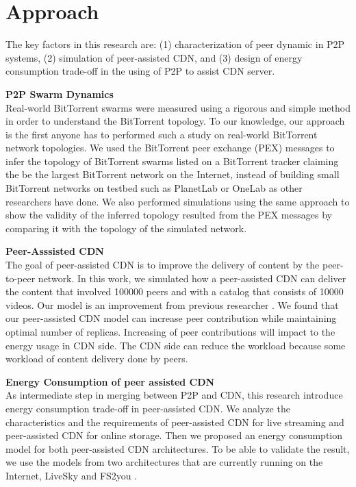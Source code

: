 \section{Approach}
The key factors in this research are: (1) characterization of peer dynamic in P2P systems, (2) simulation of peer-assisted CDN, and (3) design of energy consumption trade-off in the using of P2P to assist CDN server.

\textbf{P2P Swarm Dynamics}\\
Real-world BitTorrent swarms were measured using a rigorous and simple method in order to understand the BitTorrent topology. 
To our knowledge, our approach is the first anyone has to performed such a study on real-world BitTorrent network topologies. 
We used the BitTorrent peer exchange (PEX) messages to infer the topology of BitTorrent swarms listed on a BitTorrent tracker claiming the be the largest BitTorrent network on the Internet, instead of building small BitTorrent networks on testbed such as PlanetLab or OneLab as other researchers have done\cite{dale2008evolution}.
We also performed simulations using the same approach to show the validity of the inferred topology resulted from the PEX messages by comparing it with the topology of the simulated network.

\textbf{Peer-Asssisted CDN}\\
The goal of peer-assisted CDN is to improve the delivery of content by the peer-to-peer network.  
In this work, we simulated how a peer-assisted CDN can deliver the content that involved 100000 peers and with a catalog that consists of 10000 videos.
Our model is an improvement from previous researcher \cite{1613869}.
We found that our peer-assisted CDN model can increase peer contribution while maintaining optimal number of replicas.
Increasing of peer contributions will impact to the energy usage in CDN side. 
The CDN side can reduce the workload because some workload of content delivery done by peers.


\textbf{Energy Consumption of peer assisted CDN}\\
As intermediate step in merging between P2P and CDN, this research introduce energy consumption trade-off in peer-assisted CDN. 
We analyze the characteristics and the requirements of peer-assisted CDN for live streaming and peer-assisted CDN for online storage.
Then we proposed an energy consumption model for both peer-assisted CDN architectures.
To be able to validate the result, we use the models from two architectures that are currently running on the Internet, LiveSky \cite{Yin:2010:LEC:1823746.1823750} and FS2you \cite{fs2you}.
 


